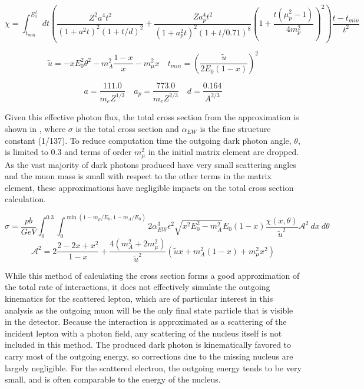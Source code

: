\begin{equation}
	\label{eq:chi}
	\chi = \int^{E_0^2}_{t_{min}} dt \left( \frac{Z^2a^4t^2}{(1+a^2t)^2(1+t/d)^2}+\frac{Za_p^4t^2}{(1+a_p^2t)^2(1+t/0.71)^8}\left(1+\frac{t(\mu_p^2-1)}{4m_p^2}\right)^2\right)\frac{t-t_{min}}{t^2}
\end{equation}

\begin{equation}
	\label{eq:utilde}
	\tilde{u} = -xE_0^2\theta^2 - m_A^2\frac{1-x}{x} - m_\mu^2x
	\quad
	t_{min} = \left(\frac{\tilde{u}}{2E_0(1-x)}\right)^2
\end{equation}

\begin{equation}
	\label{eq:adefs}
	a = \frac{111.0}{m_e Z^{1/3}}
	\quad
	a_p = \frac{773.0}{m_e Z^{2/3}}
	\quad
	d = \frac{0.164}{A^{2/3}}
\end{equation}

Given this effective photon flux, the total cross section from the \ww approximation is shown in  \cite{Bjorken_2009}, where $\sigma$ is the total cross section and $\alpha_{EW}$ is the fine structure constant (1/137).
To reduce computation time the outgoing dark photon angle, $\theta$, is limited to 0.3 and terms of order $m_\mu^2$ in the initial matrix element are dropped.
As the vast majority of dark photons produced have very small scattering angles and the muon mass is small with respect to the other terms in the matrix element, these approximations have negligible impacts on the total cross section calculation.

\begin{equation}
	\label{eq:fullCX}
        \sigma = \frac{pb}{GeV} \int_0^{0.3} \int_0^{\min(1-m_\mu/E_0,1-m_A/E_0)} 2 \alpha_{EW}^3\epsilon^2 \sqrt{x^2E_0^2 - m_A^2}E_0(1-x) 
	    \frac{\chi(x,\theta)}{\tilde{u}^2} \mathcal{A}^2
~dx~d\theta
\end{equation}
\begin{equation}
	\label{eq:afunc}
	\mathcal{A}^2 = 2\frac{2-2x+x^2}{1-x}+\frac{4(m_A^2+2m_\mu^2)}{\tilde{u}^2}(\tilde{u}x + m_A^2(1-x) + m_\mu^2x^2)
\end{equation}

While this method of calculating the cross section forms a good approximation of the total rate of \dbrem interactions, it does not effectively simulate the outgoing kinematics for the scattered lepton, which are of particular interest in this analysis as the outgoing muon will be the only final state particle that is visible in the detector.
Because the interaction is approximated as a scattering of the incident lepton with a photon field, any scattering of the nucleus itself is not included in this method.
The produced dark photon is kinematically favored to carry most of the outgoing energy, so corrections due to the missing nucleus are largely negligible.
For the scattered electron, the outgoing energy tends to be very small, and is often comparable to the energy of the nucleus.

